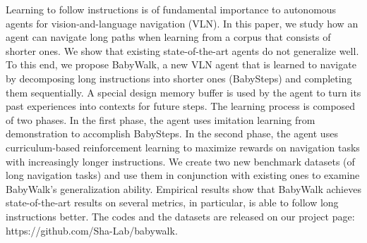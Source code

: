 Learning to follow instructions is of fundamental importance to autonomous agents for vision-and-language navigation (VLN). In this paper, we study how an agent can navigate long paths when learning from a corpus that consists of shorter ones.  We show that existing state-of-the-art agents do not generalize well. To this end, we propose BabyWalk, a new VLN agent that is learned to navigate by decomposing long instructions into shorter ones (BabySteps) and completing them sequentially. A special design memory buffer is used by the agent to turn its past experiences into contexts for future steps. The learning process is composed of two phases. In the first phase, the agent uses imitation learning from demonstration to accomplish BabySteps. In the second phase, the agent uses curriculum-based reinforcement learning to maximize rewards on navigation tasks with increasingly longer instructions. We create two new benchmark datasets (of long navigation tasks) and use them in conjunction with existing ones to examine BabyWalk's generalization ability. Empirical results show that BabyWalk achieves state-of-the-art results on several metrics, in particular, is able to follow long instructions better.  The codes and the datasets are released on our project page: https://github.com/Sha-Lab/babywalk.
